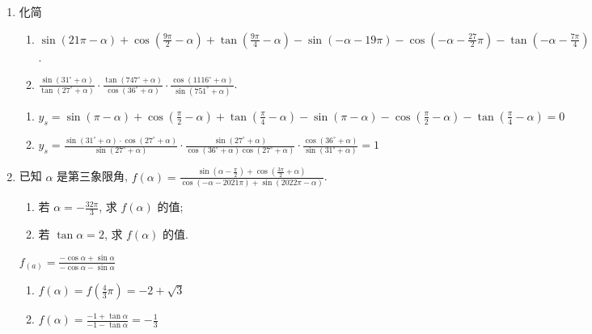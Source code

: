\begin{enumerate}
\item 化简
\begin{enumerate}
    \item $\sin \left(21 \pi-\alpha\right)+\cos \left(\frac{9 \pi}{2}-\alpha\right)+\tan \left(\frac{9 \pi}{4}-\alpha\right)-\sin \left(-\alpha-19 \pi\right)-\cos \left(-\alpha-\frac{27}{2} \pi\right)-\tan \left(-\alpha-\frac{7 \pi}{4}\right)$.
    \item $\frac{\sin \left(31^{\circ}+\alpha\right)}{\tan \left(27^{\circ}+\alpha\right)} \cdot \frac{\tan \left(747^{\circ}+\alpha\right)}{\cos \left(36^{\circ}+\alpha\right)} \cdot \frac{\cos \left(1116^{\circ}+\alpha\right)}{\sin \left(751^{\circ}+\alpha\right)}$.
\end{enumerate}
\begin{jieda}
    \begin{enumerate}
\item $ y_s=\sin \left(\pi-\alpha\right)+\cos \left(\frac{\pi}{2}-\alpha\right)+\tan \left(\frac{\pi}{4}-\alpha\right)-\sin \left(\pi-\alpha\right)-\cos \left(\frac{\pi}{2}-\alpha\right)-\tan \left(\frac{\pi}{4}-\alpha\right)=0 $
\item $y_s=\frac{\sin \left(31^{\circ}+\alpha\right) \cdot \cos \left(27^{\circ}+\alpha\right)}{\sin \left(27^{\circ}+\alpha\right)} \cdot \frac{\sin \left(27^{\circ}+\alpha\right)}{\cos \left(36^{\circ}+\alpha\right) \cos \left(27^{\circ}+\alpha\right)} \cdot \frac{\cos \left(36^{\circ}+\alpha\right)}{\sin \left(31^{\circ}+\alpha\right)}=1$
\end{enumerate}
\end{jieda}



\item 已知 $\alpha$ 是第三象限角, $f\left(\alpha\right)=\frac{\sin \left(\alpha-\frac{\pi}{2}\right)+\cos \left(\frac{3 \pi}{2}+\alpha\right)}{\cos \left(-\alpha-2021 \pi\right)+\sin \left(2022 \pi-\alpha\right)}$.
\begin{enumerate}
    \item 若 $\alpha=-\frac{32 \pi}{3}$, 求 $f\left(\alpha\right)$ 的值;
    \item 若 $\tan \alpha=2$, 求 $f\left(\alpha\right)$ 的值.
\end{enumerate}
\begin{jieda}
$f_{\left(a\right)}=\frac{-\cos \alpha+\sin \alpha}{-\cos \alpha-\sin \alpha}$
    \begin{enumerate}
        \item $f\left(\alpha\right)=f\left(\frac{4}{3} \pi\right)=-2+\sqrt{3}$
        \item $f\left(\alpha\right)=\frac{-1+\tan \alpha}{-1-\tan \alpha}=-\frac{1}{3}$
    \end{enumerate}
\end{jieda}


\end{enumerate}

